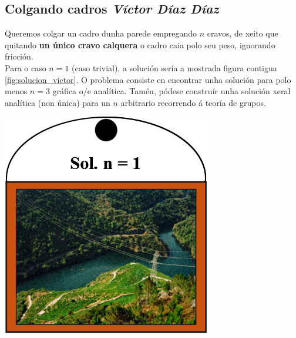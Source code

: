 \begin{refsection}
\newpage

\section*{\textcolor{Resalte}{Colgando cadros} {\normalfont \itshape Víctor Díaz Díaz}}%

\begin{multicols}{2}

Queremos colgar un cadro dunha parede empregando $n$ cravos, de xeito que
quitando \textbf{un único cravo calquera} o cadro caia polo seu peso, ignorando
fricción.\\
Para o caso $n=1$ (caso trivial), a solución sería a mostrada figura contigua \ref{fig:solucion_victor}. O problema consiste en encontrar unha solución para polo menos $n=3$ gráfica o/e analítica. Tamén, pódese construír unha solución xeral analítica (non única) para un $n$ arbitrario recorrendo á teoría de grupos.

\nocite{Demaine_2013}
\printbibliography
\hfill
\goodbreak

\begin{center}
    \captionsetup{justification=centering}
    \includegraphics[width=0.7\linewidth]{revistas/002/imaxes/solucion_victor.png}
    \label{fig:solucion_victor}
\end{center}

\end{multicols}
\end{refsection}


